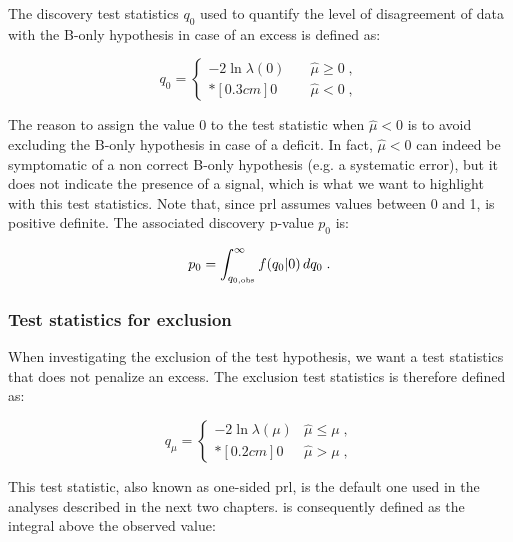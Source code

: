 The discovery test statistics $q_{0}$ used to quantify the level of disagreement of data with the B-only hypothesis in case of an excess is defined as:

\begin{equation}
\label{eq:stat:q0}
q_{0} =
\left\{ \! \! \begin{array}{ll}
               - 2 \ln \lambda(0)
               & \quad \hat{\mu} \ge 0 \;, \\*[0.3 cm]
               0 & \quad \hat{\mu} < 0  \;,
              \end{array}
       \right.
\end{equation}
 
\noindent The reason to assign the value 0 to the test statistic when $\hat{\mu} < 0$ is to avoid excluding the B-only hypothesis in case of a deficit. In fact, $\hat{\mu} < 0$ can indeed be symptomatic of a non correct B-only hypothesis (e.g. a systematic error), but it does not indicate the presence of a signal, which is what we want to highlight with this test statistics. Note that, since \gls{prl} assumes values between 0 and 1, \qzero is positive definite. The associated discovery p-value $p_{0}$ is:

\begin{equation}
\label{eq:stat:p0}
p_{0} = \int_{q_{0,{\rm obs}}}^{\infty} f(q_{0} | 0 ) \, d q_{0} \; .
\end{equation}

\subsubsection*{Test statistics for exclusion}

When investigating the exclusion of the test hypothesis, we want a test statistics that does not penalize an excess. The exclusion test statistics \qmu is therefore defined as:

\begin{equation}
\label{eq:stat:qmu}
q_{\mu} =
\left\{ \! \! \begin{array}{ll}
               - 2 \ln \lambda(\mu)  & \hat{\mu} \le \mu  \;, \\*[0.2 cm]
               0 & \hat{\mu} > \mu \;,
              \end{array}
       \right.
\end{equation}

\noindent This test statistic, also known as one-sided \gls{prl}, is the default one used in the analyses described in the next two chapters. \pmu is consequently defined as the integral above the observed value: 

